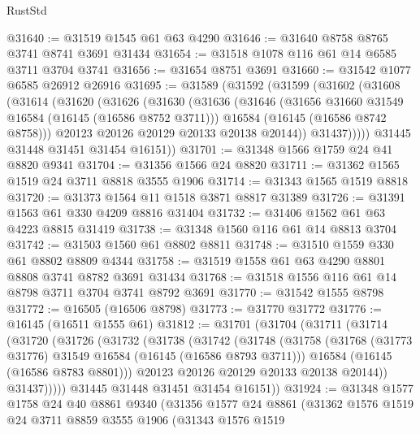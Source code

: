 \begin{lexlean}{RustStd}
\begin{coremodule}
@31640 := @31519 @1545 @61 @63 @4290
@31646 := @31640 @8758 @8765 @3741 @8741 @3691 @31434
@31654 := @31518 @1078 @116 @61 @14 @6585 @3711 @3704 @3741
@31656 := @31654 @8751 @3691
@31660 := @31542 @1077 @6585 @26912 @26916
@31695 := @31589
    (@31592
      (@31599
        (@31602
          (@31608
            (@31614
              (@31620
                (@31626
                  (@31630
                    (@31636
                      (@31646
                        (@31656 @31660 @31549 @16584 (@16145 (@16586 @8752 @3711)))
                        @16584
                        (@16145 (@16586 @8742 @8758)))
                      @20123
                      @20126
                      @20129
                      @20133
                      @20138
                      @20144))
                  @31437)))))
        @31445
        @31448
        @31451
        @31454
        @16151))
@31701 := @31348 @1566 @1759 @24 @41 @8820 @9341
@31704 := @31356 @1566 @24 @8820
@31711 := @31362 @1565 @1519 @24 @3711 @8818 @3555 @1906
@31714 := @31343 @1565 @1519 @8818
@31720 := @31373 @1564 @11 @1518 @3871 @8817 @31389
@31726 := @31391 @1563 @61 @330 @4209 @8816 @31404
@31732 := @31406 @1562 @61 @63 @4223 @8815 @31419
@31738 := @31348 @1560 @116 @61 @14 @8813 @3704
@31742 := @31503 @1560 @61 @8802 @8811
@31748 := @31510 @1559 @330 @61 @8802 @8809 @4344
@31758 := @31519 @1558 @61 @63 @4290 @8801 @8808 @3741 @8782 @3691 @31434
@31768 := @31518 @1556 @116 @61 @14 @8798 @3711 @3704 @3741 @8792 @3691
@31770 := @31542 @1555 @8798
@31772 := @16505 (@16506 @8798)
@31773 := @31770 @31772
@31776 := @16145 (@16511 @1555 @61)
@31812 := @31701
    (@31704
      (@31711
        (@31714
          (@31720
            (@31726
              (@31732
                (@31738
                  (@31742
                    (@31748
                      (@31758
                        (@31768 (@31773 @31776) @31549 @16584 (@16145 (@16586 @8793 @3711)))
                        @16584
                        (@16145 (@16586 @8783 @8801)))
                      @20123
                      @20126
                      @20129
                      @20133
                      @20138
                      @20144))
                  @31437)))))
        @31445
        @31448
        @31451
        @31454
        @16151))
@31924 := @31348
    @1577
    @1758
    @24
    @40
    @8861
    @9340
    (@31356
      @1577
      @24
      @8861
      (@31362
        @1576
        @1519
        @24
        @3711
        @8859
        @3555
        @1906
        (@31343
          @1576
          @1519

\end{coremodule}
\end{lexlean}
